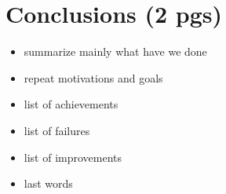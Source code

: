 \chapter{Conclusions (2 pgs)}

\begin{itemize}
	\item summarize mainly what have we done
	\item repeat motivations and goals
	\item list of achievements
	\item list of failures
	\item list of improvements
	\item last words
\end{itemize}

\newpage
